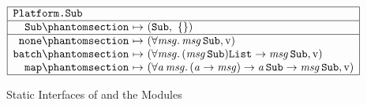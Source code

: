 \begin{figure}[htbp]
\[\begin{array}{|r@{\ }c@{\ }l|}
\hline
\multicolumn{3}{|l|}{\kw{Platform.Sub}}\\
\hline
\kw{Sub}\citelabel{b:Platform.Sub.Sub} & \mapsto & (\sbtSub,\ \emptymap)\\
\hline
\kw{none}\citelabel{b:Platform.Sub.none} & \mapsto & (\forall\mv{msg}.\,\mv{msg}\,\sbtSub, \isv)\\
\kw{batch}\citelabel{b:Platform.Sub.batch} & \mapsto & (\forall\mv{msg}.\,(\mv{msg}\,\sbtSub)\tList \rightarrow \mv{msg}\,\sbtSub, \isv)\\
\kw{map}\citelabel{b:Platform.Sub.map} & \mapsto & (\forall\mv{a}\,\mv{msg}.\,(\mv{a} \rightarrow \mv{msg}) \rightarrow \mv{a}\,\sbtSub \rightarrow \mv{msg}\,\sbtSub, \isv)\\
\hline
\end{array}
\]
\caption{Static Interfaces of  and the  Modules}\label{fig:static-basis-platform}
\end{figure}

